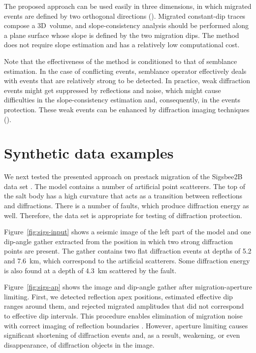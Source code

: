 The proposed approach can be used easily in three dimensions, in which migrated events are defined by two orthogonal directions
(\citealp[]{klokov12}). Migrated constant-dip traces compose a 3D~volume, and slope-consistency analysis should be performed along a plane
surface whose slope is defined
by the two migration dips. The method does not require slope estimation and has a relatively low computational cost.

Note that the effectiveness of the method is conditioned to that of semblance estimation. In the case of conflicting events, semblance
operator effectively deals with events that are relatively strong to be detected. In practice, weak diffraction events might get suppressed
by reflections and noise, which might cause difficulties in the slope-consistency estimation and, consequently, in the events protection.
These weak events can be enhanced by diffraction imaging techniques (\citealp[]{fomel07,klokov12}).

\section{Synthetic data examples}

We next tested the presented approach on prestack migration of the Sigsbee2B data set \cite[]{paffenholz02}.
The model contains a number of artificial point scatterers. The top of the salt body has a high curvature that acts as a transition between 
reflections and diffractions. There is a number of faults, which produce diffraction energy as well. Therefore, the data set is 
appropriate for testing of diffraction protection.

Figure~\ref{fig:sigs-input} shows a seismic image of the left part of the model and one dip-angle gather 
extracted from the position
in which two strong diffraction points are present. The gather contains two flat diffraction events at depths of 5.2 and 7.6~km,
which correspond to the artificial scatterers. Some diffraction energy is also found at a depth of 4.3~km scattered by the fault.

Figure~\ref{fig:sigs-ap} shows the image and dip-angle gather after migration-aperture limiting. First, we detected reflection apex positions,
estimated effective dip ranges around them, and rejected migrated amplitudes that did not correspond to effective dip intervals. This procedure enables
elimination of migration noise with correct imaging of reflection boundaries \cite[]{bienati09}. However, aperture limiting causes significant shortening 
of diffraction events and, as a result, weakening, or even disappearance, of diffraction objects in the image.

